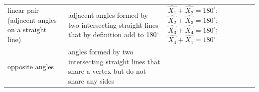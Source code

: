 {\begin{tabular}[t]{|l|l|l|}
    
        linear pair (adjacent angles on a straight line) &
    
    
        adjacent angles formed by two intersecting straight lines that by definition add to 180\begin{math}{}^{\circ }\end{math} &
    
    
        
                  \begin{math}\hat{{X}_{1}}+\hat{{X}_{2}}={180}^{\circ }\end{math};
                  \begin{math}\hat{{X}_{2}}+\hat{{X}_{3}}={180}^{\circ }\end{math};
                  \begin{math}\hat{{X}_{3}}+\hat{{X}_{4}}={180}^{\circ }\end{math};
                  \begin{math}\hat{{X}_{4}}+\hat{{X}_{1}}={180}^{\circ }\end{math}
     \tabularnewline\cline{1-1}\cline{2-2}\cline{3-3}
    
    
        opposite angles &
    
    
        angles formed by two intersecting straight lines that share a vertex but do not share any sides &
    
    

\end{tabular}}

